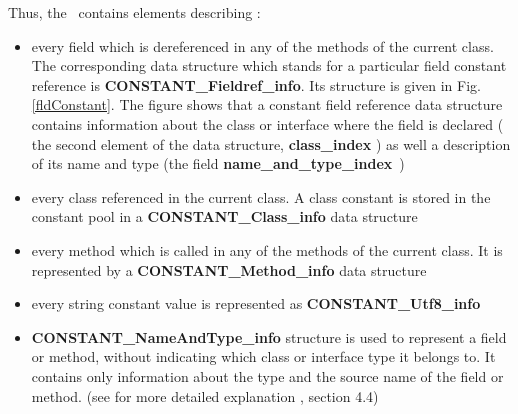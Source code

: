Thus, the \constantPool \ contains elements describing :
\begin{itemize}
  \item every field which is dereferenced in any of the methods
of the current class. The corresponding data structure which stands for a particular field constant reference is 
 \textbf{CONSTANT\_Fieldref\_info}. Its structure is given in Fig.\ref{fldConstant}. The figure shows that
 a constant  field reference data structure contains information about the class or interface where the field is declared 
( the second element of the data structure, \textbf{class\_index}  )
 as well a description of its name and type (the field \textbf{name\_and\_type\_index}~)
   
\item every class referenced in the current class.  A class constant is stored in the constant pool
         in a  \textbf{CONSTANT\_Class\_info} data structure 
    
 \item every method which is called in any of the methods
of the current class. It is represented by a  \textbf{CONSTANT\_Method\_info} data structure
      
	
\item  every string constant value is represented as \textbf{CONSTANT\_Utf8\_info}
\item  \textbf{CONSTANT\_NameAndType\_info}  structure is used to represent a field or method, without indicating which class or interface type it belongs to.
       It contains only information about the type and the source name of the field or  method. 
       (see for more detailed explanation \cite{VMSpec}, section 4.4) 

\end{itemize}

 

